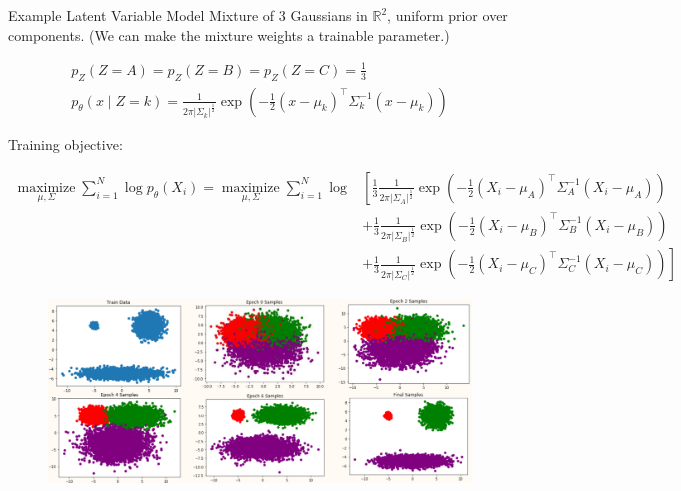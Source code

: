 \begin{frame}[allowframebreaks]

\begin{myexampleblock}{11.5}{Example Latent Variable Model}
    Mixture of 3 Gaussians in $\mathbb{R}^{2}$, uniform prior over components. (We can make the mixture weights a trainable parameter.)

    $$
    \begin{gathered}
    p_{Z}(Z=A)=p_{Z}(Z=B)=p_{Z}(Z=C)=\frac{1}{3} \\
    p_{\theta}(x \mid Z=k)=\frac{1}{2 \pi\left|\Sigma_{k}\right|^{\frac{1}{2}}} \exp \left(-\frac{1}{2}\left(x-\mu_{k}\right)^{\top} \Sigma_{k}^{-1}\left(x-\mu_{k}\right)\right)
    \end{gathered}
    $$

    Training objective:

    $$
    \begin{aligned}
    \underset{\mu, \Sigma}{\operatorname{maximize}} \sum_{i=1}^{N} \log p_{\theta}\left(X_{i}\right)=\underset{\mu, \Sigma}{\operatorname{maximize}} \sum_{i=1}^{N} \log & \left[ \frac{1}{3} \frac{1}{2 \pi\left|\Sigma_{A}\right|^{\frac{1}{2}}} \exp \left(-\frac{1}{2}\left(X_{i}-\mu_{A}\right)^{\top} \Sigma_{A}^{-1}\left(X_{i}-\mu_{A}\right)\right) \right.\\
    & +\frac{1}{3} \frac{1}{2 \pi\left|\Sigma_{B}\right|^{\frac{1}{2}}} \exp \left(-\frac{1}{2}\left(X_{i}-\mu_{B}\right)^{\top} \Sigma_{B}^{-1}\left(X_{i}-\mu_{B}\right)\right) \\
    & \left.+\frac{1}{3} \frac{1}{2 \pi\left|\Sigma_{C}\right|^{\frac{1}{2}}} \exp \left(-\frac{1}{2}\left(X_{i}-\mu_{C}\right)^{\top} \Sigma_{C}^{-1}\left(X_{i}-\mu_{C}\right)\right)\right]
    \end{aligned}
    $$

    \begin{figure}[H]
        \centering
        \includegraphics[width=1.0\textwidth]{.././assets/11.3.png}
    \end{figure}
\end{myexampleblock}

\end{frame}

